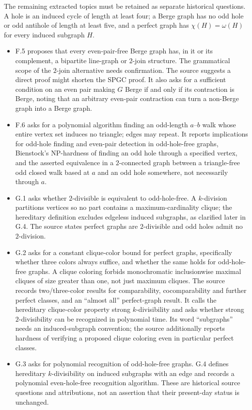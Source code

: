 \documentclass[11pt]{article}
\begin{document}
The remaining extracted topics must be retained as separate historical questions. A hole is an induced cycle of length at least four; a Berge graph has no odd hole or odd antihole of length at least five, and a perfect graph has $\chi(H)=\omega(H)$ for every induced subgraph $H$.
\begin{itemize}
\item F.5 proposes that every even-pair-free Berge graph has, in it or its complement, a bipartite line-graph or $2$-join structure. The grammatical scope of the $2$-join alternative needs confirmation. The source suggests a direct proof might shorten the SPGC proof. It also asks for a sufficient condition on an even pair making $G$ Berge if and only if its contraction is Berge, noting that an arbitrary even-pair contraction can turn a non-Berge graph into a Berge graph.
\item F.6 asks for a polynomial algorithm finding an odd-length $a$--$b$ walk whose entire vertex set induces no triangle; edges may repeat. It reports implications for odd-hole finding and even-pair detection in odd-hole-free graphs, Bienstock's NP-hardness of finding an odd hole through a specified vertex, and the asserted equivalence in a $2$-connected graph between a triangle-free odd closed walk based at $a$ and an odd hole somewhere, not necessarily through $a$.
\item G.1 asks whether $2$-divisible is equivalent to odd-hole-free. A $k$-division partitions vertices so no part contains a maximum-cardinality clique; the hereditary definition excludes edgeless induced subgraphs, as clarified later in G.4. The source states perfect graphs are $2$-divisible and odd holes admit no $2$-division.
\item G.2 asks for a constant clique-color bound for perfect graphs, specifically whether three colors always suffice, and whether the same holds for odd-hole-free graphs. A clique coloring forbids monochromatic inclusionwise maximal cliques of size greater than one, not just maximum cliques. The source records two/three-color results for comparability, cocomparability and further perfect classes, and an ``almost all'' perfect-graph result. It calls the hereditary clique-color property strong $k$-divisibility and asks whether strong $2$-divisibility can be recognized in polynomial time. Its word ``subgraphs'' needs an induced-subgraph convention; the source additionally reports hardness of verifying a proposed clique coloring even in particular perfect classes.
\item G.3 asks for polynomial recognition of odd-hole-free graphs. G.4 defines hereditary $k$-divisibility on induced subgraphs with an edge and records a polynomial even-hole-free recognition algorithm. These are historical source questions and attributions, not an assertion that their present-day status is unchanged.
\end{itemize}
\end{document}
